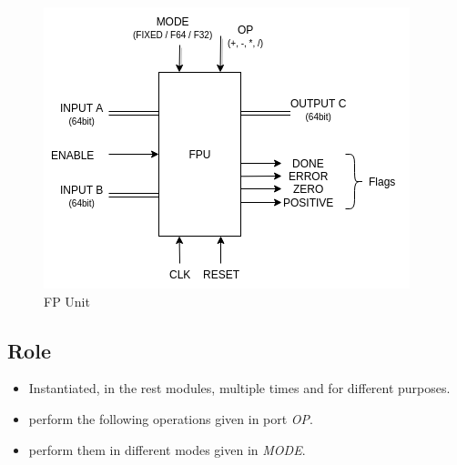 \documentclass[12pt]{report}
\begin{document}
\begin{center}
    \begin{figure}[hp]
        \centering
        \includegraphics[width=\textwidth]{FPU}
        \caption{FP Unit}
        \label{fig:fpu}
    \end{figure}
\end{center}

\subsection{Role}
\begin{itemize}
    \item Instantiated, in the rest modules, multiple times and for different purposes.
    \item perform the following operations given in port \emph{OP}.
    \item perform them in different modes given in \emph{MODE}.
\end{itemize}
\end{document}
